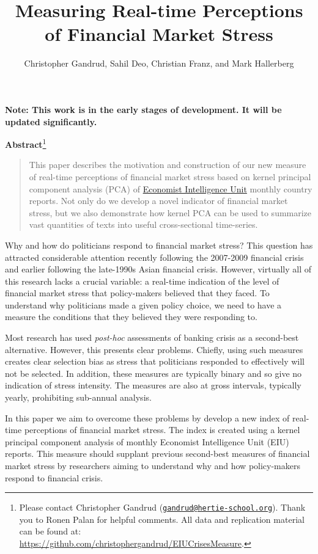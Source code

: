 \documentclass[]{article}
\title{Measuring Real-time Perceptions of Financial Market Stress}
\author{Christopher Gandrud, Sahil Deo, Christian Franz, and Mark Hallerberg}
\date{}
\let\rmarkdownfootnote\footnote%
\def\footnote{\protect\rmarkdownfootnote}
\begin{document}
\maketitle


\textbf{Note: This work is in the early stages of development. It will
be updated significantly.}

\textbf{Abstract}\footnote{Please contact Christopher Gandrud
  (\href{mailto:gandrud@hertie-school.org}{\nolinkurl{gandrud@hertie-school.org}}).
  Thank you to Ronen Palan for helpful comments. All data and
  replication material can be found at:
  \url{https://github.com/christophergandrud/EIUCrisesMeasure}.}

\begin{quote}
This paper describes the motivation and construction of our new measure
of real-time perceptions of financial market stress based on kernel
principal component analysis (PCA) of
\href{http://www.eiu.com/}{Economist Intelligence Unit} monthly country
reports. Not only do we develop a novel indicator of financial market
stress, but we also demonstrate how kernel PCA can be used to summarize
vast quantities of texts into useful cross-sectional time-series.
\end{quote}

Why and how do politicians respond to financial market stress? This
question has attracted considerable attention recently following the
2007-2009 financial crisis and earlier following the late-1990s Asian
financial crisis. However, virtually all of this research lacks a
crucial variable: a real-time indication of the level of financial
market stress that policy-makers believed that they faced. To understand
why politicians made a given policy choice, we need to have a measure
the conditions that they believed they were responding to.

Most research has used \emph{post-hoc} assessments of banking crisis as
a second-best alternative. However, this presents clear problems.
Chiefly, using such measures creates clear selection bias as stress that
politicians responded to effectively will not be selected. In addition,
these measures are typically binary and so give no indication of stress
intensity. The measures are also at gross intervals, typically yearly,
prohibiting sub-annual analysis.

In this paper we aim to overcome these problems by develop a new index
of real-time perceptions of financial market stress. The index is
created using a kernel principal component analysis of monthly Economist
Intelligence Unit (EIU) reports. This measure should supplant previous
second-best measures of financial market stress by researchers aiming to
understand why and how policy-makers respond to financial crisis.
\end{document}
